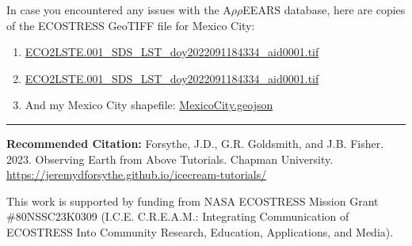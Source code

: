 \documentclass[oneside,a4paper,11pt,explicit]{book}
\begin{document}
\begin{tcolorbox}[colback=yellow!5!white,title=\textbf{Datafiles}]
	\large
	In case you encountered any issues with the A$\rho\rho$EEARS database, here are copies of the ECOSTRESS GeoTIFF file for Mexico City:

    \begin{enumerate}
        \item \href{https://jeremydforsythe.github.io/icecream-tutorials/Tutorial10_RasterCalculator/ECO2LSTE.001_SDS_LST_doy2022091184334_aid0001.tif}{\small ECO2LSTE.001\_SDS\_LST\_doy2022091184334\_aid0001.tif}
        \item \href{https://jeremydforsythe.github.io/icecream-tutorials/Tutorial10_RasterCalculator/ECO2LSTE.001_SDS_LST_doy2022091184334_aid0001.tif}{\small ECO2LSTE.001\_SDS\_LST\_doy2022091184334\_aid0001.tif}
        \item And my Mexico City shapefile: \href{https://jeremydforsythe.github.io/icecream-tutorials/Tutorial8_ESI/MexicoCityPolygon/MexicoCity.geojson}{\small MexicoCity.geojson}
    \end{enumerate}
\end{tcolorbox}


\hrule

\vspace{1em}

\small \textbf{Recommended Citation:} Forsythe, J.D., G.R. Goldsmith, and J.B. Fisher. 2023. Observing Earth from Above Tutorials. Chapman University. \url{https://jeremydforsythe.github.io/icecream-tutorials/}

\vspace{1em}

This work is supported by funding from NASA ECOSTRESS Mission Grant \#80NSSC23K0309 (I.C.E. C.R.E.A.M.: Integrating Communication of ECOSTRESS Into Community Research, Education, Applications, and Media).
\end{document}
